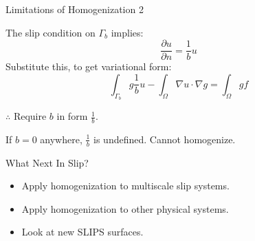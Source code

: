 \documentclass{beamer}
\begin{document}
\begin{frame}{Limitations of Homogenization 2}

The slip condition on $\Gamma_b$ implies:
\begin{equation}
\frac{\partial u}{\partial n} = \frac{1}{b}u
\end{equation}
Substitute this, to get variational form:
\begin{equation}
\int_{\Gamma_b} g \frac{1}{b} u 
 - \int_{\Omega} \nabla u \cdot \nabla g  
= \int_{\Omega} g f
\end{equation}

$\therefore$ Require $b$ in form $\displaystyle \frac{1}{b}$.

\vspace{1em}
If $b=0$ anywhere, $\frac{1}{b}$ is undefined. \phantom{word}Cannot homogenize.

\end{frame}


\begin{frame}{What Next In Slip?}
\begin{itemize}
\item Apply homogenization to multiscale slip systems.
\item Apply homogenization to other physical systems.
\item Look at new SLIPS surfaces.
\end{itemize}

\end{frame}
\end{document}
